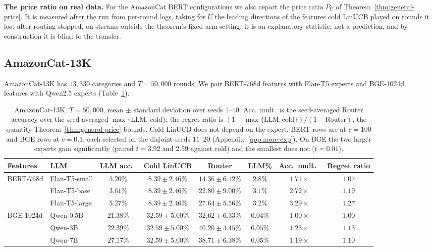 \documentclass{article}
\theoremstyle{definition}
\theoremstyle{remark}
\theoremstyle{remark}
\begin{document}
\textbf{The price ratio on real data.} For the AmazonCat BERT configurations
we also report the price ratio $P_U$ of Theorem~\ref{thm:general-price}. It is
measured after the run from per-round logs, taking for $U$ the leading
directions of the features cold LinUCB played on rounds it lost after routing
stopped, on streams outside the theorem's fixed-arm setting: it is an
explanatory statistic, not a prediction, and by construction it is blind to
the transfer.

\subsection{AmazonCat-13K}
\label{sec:amazon}

AmazonCat-13K has $13{,}330$ categories and $T=50{,}000$ rounds. We pair
BERT-768d features with Flan-T5 experts and BGE-1024d features with Qwen2.5
experts (Table~\ref{tab:amazon-results}).

\begin{table}[h]
\centering
\caption{AmazonCat-13K, $T=50{,}000$, mean $\pm$ standard deviation over
seeds $1$--$10$. Acc.\ mult.\ is the seed-averaged Router accuracy over the
seed-averaged $\max\{$LLM, cold$\}$; the regret ratio is
$(1-\max\{\text{LLM},\text{cold}\})/(1-\text{Router})$, the quantity
Theorem~\ref{thm:general-price} bounds. Cold LinUCB does not depend on the
expert. BERT rows are at $c=100$ and BGE rows at $c=0.1$, each selected on
the disjoint seeds $11$--$20$ (Appendix~\ref{app:more-exp}). On BGE the
two larger experts gain significantly (paired $t=3.92$ and $2.59$ against
cold) and the smallest does not ($t=0.01$).}
\label{tab:amazon-results}
\small
\begin{tabular}{@{}llcccccc@{}}
\toprule
Features & LLM & LLM acc.\ & Cold LinUCB & Router & LLM\% & Acc.\ mult.\ & Regret ratio \\
\midrule
\multirow{3}{*}{BERT-768d} & Flan-T5-small  & $5.20\%$ & $8.39\pm2.46\%$ & $14.36\pm6.12\%$ & $2.8\%$  & $1.71\times$ & $1.07$ \\
& Flan-T5-base  & $3.61\%$ & $8.39\pm2.46\%$ & $22.80\pm9.00\%$ & $3.1\%$  & $2.72\times$ & $1.19$ \\
& Flan-T5-large & $5.27\%$ & $8.39\pm2.46\%$ & $\mathbf{27.64\pm5.56\%}$ & $3.2\%$  & $\mathbf{3.29\times}$ & $\mathbf{1.27}$ \\
\midrule
\multirow{3}{*}{BGE-1024d} & Qwen-0.5B  & $21.38\%$ & $32.59\pm5.00\%$ & $32.62\pm6.33\%$ & $0.04\%$  & $1.00\times$ & $1.00$ \\
& Qwen-3B  & $22.39\%$ & $32.59\pm5.00\%$ & $\mathbf{40.20\pm4.45\%}$ & $0.05\%$  & $\mathbf{1.23\times}$ & $\mathbf{1.13}$ \\
& Qwen-7B  & $27.17\%$ & $32.59\pm5.00\%$ & $38.71\pm6.38\%$ & $0.05\%$  & $1.19\times$ & $1.10$ \\
\bottomrule
\end{tabular}
\end{table}
\end{document}
